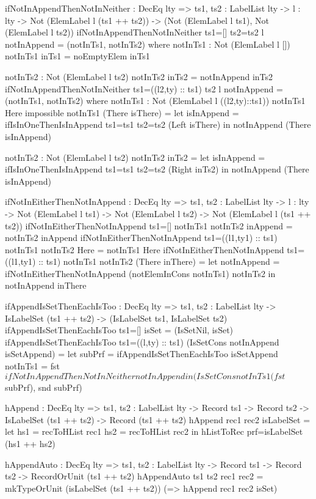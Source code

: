 \begin{code}
ifNotInAppendThenNotInNeither : DecEq lty => 
  {ts1, ts2 : LabelList lty} -> {l : lty} ->
  Not (ElemLabel l (ts1 ++ ts2)) -> 
  (Not (ElemLabel l ts1), Not (ElemLabel l ts2))
ifNotInAppendThenNotInNeither {ts1=[]} {ts2=ts2} {l} notInAppend = 
  (notInTs1, notInTs2)
   where
     notInTs1 : Not (ElemLabel l [])
     notInTs1 inTs1 = noEmptyElem inTs1
    
     notInTs2 : Not (ElemLabel l ts2)
     notInTs2 inTs2 = notInAppend inTs2
ifNotInAppendThenNotInNeither {ts1=((l2,ty) :: ts1)} {ts2} {l} 
  notInAppend = (notInTs1, notInTs2)
  where    
    notInTs1 : Not (ElemLabel l ((l2,ty)::ts1))
    notInTs1 Here impossible
    notInTs1 (There isThere) = 
      let isInAppend = 
            ifIsInOneThenIsInAppend {ts1=ts1} {ts2=ts2} 
              (Left isThere)
      in notInAppend (There isInAppend)
    
    notInTs2 : Not (ElemLabel l ts2)
    notInTs2 inTs2 =
      let isInAppend = 
            ifIsInOneThenIsInAppend {ts1=ts1} {ts2=ts2} 
              (Right inTs2)
      in notInAppend (There isInAppend)

ifNotInEitherThenNotInAppend : DecEq lty => 
  {ts1, ts2 : LabelList lty} -> {l : lty} ->
  Not (ElemLabel l ts1) -> Not (ElemLabel l ts2) -> 
  Not (ElemLabel l (ts1 ++ ts2))
ifNotInEitherThenNotInAppend {ts1=[]} notInTs1 notInTs2 inAppend = 
  notInTs2 inAppend
ifNotInEitherThenNotInAppend {ts1=((l1,ty1) :: ts1)} notInTs1 
  notInTs2 Here = notInTs1 Here
ifNotInEitherThenNotInAppend {ts1=((l1,ty1) :: ts1)} notInTs1 
  notInTs2 (There inThere) = 
  let notInAppend = 
        ifNotInEitherThenNotInAppend (notElemInCons notInTs1) 
          notInTs2
  in notInAppend inThere

ifAppendIsSetThenEachIsToo : DecEq lty => 
  {ts1, ts2 : LabelList lty} -> IsLabelSet (ts1 ++ ts2) -> 
  (IsLabelSet ts1, IsLabelSet ts2)
ifAppendIsSetThenEachIsToo {ts1=[]} isSet = (IsSetNil, isSet)
ifAppendIsSetThenEachIsToo {ts1=((l,ty) :: ts1)} 
  (IsSetCons notInAppend isSetAppend) =
  let 
    subPrf = ifAppendIsSetThenEachIsToo isSetAppend
    notInTs1 = fst $ ifNotInAppendThenNotInNeither notInAppend
  in (IsSetCons notInTs1 (fst $ subPrf), snd subPrf)

hAppend : DecEq lty => {ts1, ts2 : LabelList lty} -> 
  Record ts1 -> Record ts2 -> IsLabelSet (ts1 ++ ts2) -> 
  Record (ts1 ++ ts2)
hAppend rec1 rec2 isLabelSet =
  let
    hs1 = recToHList rec1
    hs2 = recToHList rec2
  in hListToRec {prf=isLabelSet} (hs1 ++ hs2)
    
hAppendAuto : DecEq lty => {ts1, ts2 : LabelList lty} -> 
  Record ts1 -> Record ts2 -> RecordOrUnit (ts1 ++ ts2)
hAppendAuto {ts1} {ts2} rec1 rec2 = 
  mkTypeOrUnit (isLabelSet (ts1 ++ ts2)) 
    (\isSet => hAppend rec1 rec2 isSet)


\end{code}
